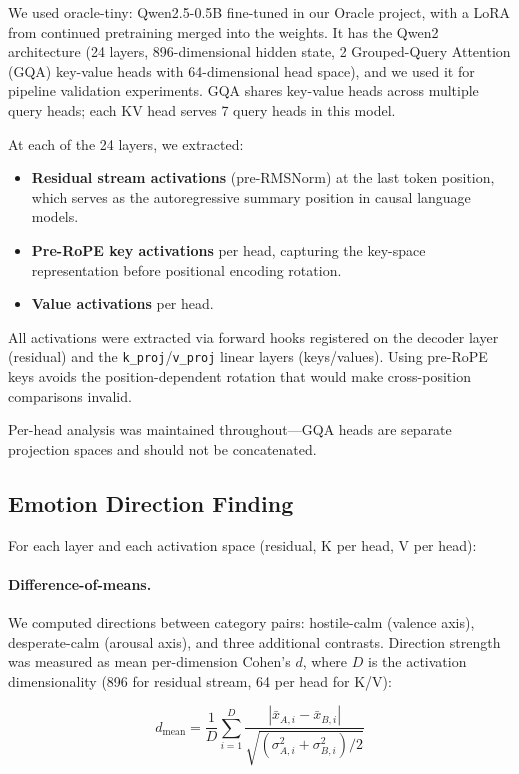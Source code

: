 \documentclass[11pt,a4paper]{article}
\begin{document}
We used oracle-tiny: Qwen2.5-0.5B fine-tuned in our Oracle project, with a
LoRA from continued pretraining merged into the weights. It has the Qwen2
architecture (24 layers, 896-dimensional hidden state, 2
Grouped-Query Attention (GQA) key-value heads with 64-dimensional head
space), and we used it for pipeline validation experiments. GQA shares key-value heads
across multiple query heads; each KV head serves 7 query heads in this
model.

At each of the 24 layers, we extracted:
\begin{itemize}[nosep]
    \item \textbf{Residual stream activations} (pre-RMSNorm) at the last
          token position, which serves as the autoregressive summary
          position in causal language models.
    \item \textbf{Pre-RoPE key activations} per head, capturing the
          key-space representation before positional encoding rotation.
    \item \textbf{Value activations} per head.
\end{itemize}

All activations were extracted via forward hooks registered on the
decoder layer (residual) and the \texttt{k\_proj}/\texttt{v\_proj}
linear layers (keys/values). Using pre-RoPE keys avoids the
position-dependent rotation that would make cross-position comparisons
invalid.

Per-head analysis was maintained throughout---GQA heads are separate
projection spaces and should not be concatenated.

\subsection{Emotion Direction Finding}

For each layer and each activation space (residual, K per head, V per
head):

\paragraph{Difference-of-means.} We computed directions between category
pairs: hostile-calm (valence axis), desperate-calm (arousal axis), and
three additional contrasts. Direction strength was measured as mean
per-dimension Cohen's $d$, where $D$ is the activation dimensionality
(896 for residual stream, 64 per head for K/V):

\begin{equation}
d_{\text{mean}} = \frac{1}{D} \sum_{i=1}^{D}
\frac{|\bar{x}_{A,i} - \bar{x}_{B,i}|}
{\sqrt{(\sigma^2_{A,i} + \sigma^2_{B,i})/2}}
\label{eq:cohend}
\end{equation}
\end{document}

